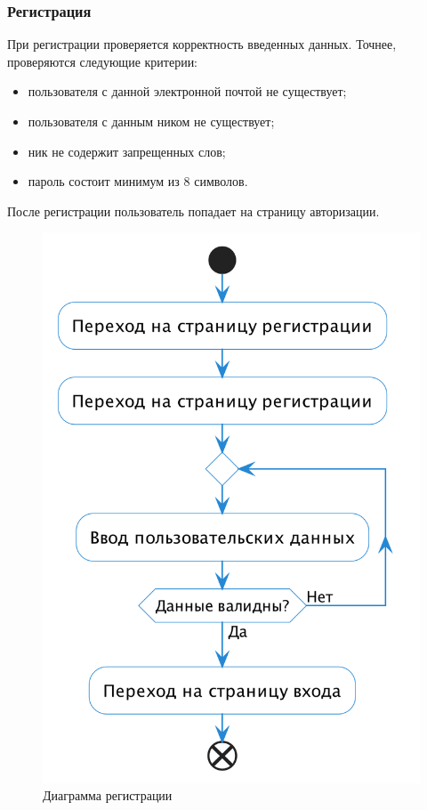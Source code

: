\documentclass[a4paper,14pt]{extarticle}
\begin{document}
\subsubsection*{Регистрация}

При регистрации проверяется корректность введенных данных. Точнее, проверяются следующие критерии:
\begin{itemize}
    \item пользователя с данной электронной почтой не существует;
    \item пользователя с данным ником не существует;
    \item ник не содержит запрещенных слов;
    \item пароль состоит минимум из 8 символов.
\end{itemize}
После регистрации пользователь попадает на страницу авторизации.

\begin{figure}[H]
    \centering
    \includegraphics[height=0.4\textheight]{images/register.png}
    \caption{Диаграмма регистрации}
\end{figure}
\end{document}
